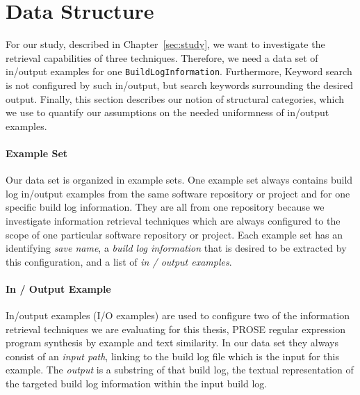 \documentclass[\myrootdir/main.tex]{subfiles}
\begin{document}


\section{Data Structure}
For our study, described in Chapter~\ref{sec:study}, we want to investigate the retrieval capabilities of three techniques. Therefore, we need a data set of in/output examples for one \texttt{BuildLogInformation}. Furthermore, Keyword search is not configured by such in/output, but search keywords surrounding the desired output. Finally, this section describes our notion of structural categories, which we use to quantify our assumptions on the needed uniformness of in/output examples.

\paragraph{Example Set}
Our data set is organized in example sets. One example set always contains build log in/output examples from the same software repository or project and for one specific build log information. They are all from one repository because we investigate information retrieval techniques which are always configured to the scope of one particular software repository or project.
Each example set has an identifying \emph{save name}, a \emph{build log information} that is desired to be extracted by this configuration, and a list of \emph{in / output examples}.

\paragraph{In / Output Example}
In/output examples (I/O examples) are used to configure two of the information retrieval techniques we are evaluating for this thesis, PROSE regular expression program synthesis by example and text similarity.
In our data set they always consist of an \emph{input path}, linking to the build log file which is the input for this example.
The \emph{output} is a substring of that build log, the textual representation of the targeted build log information within the input build log.
\end{document}
